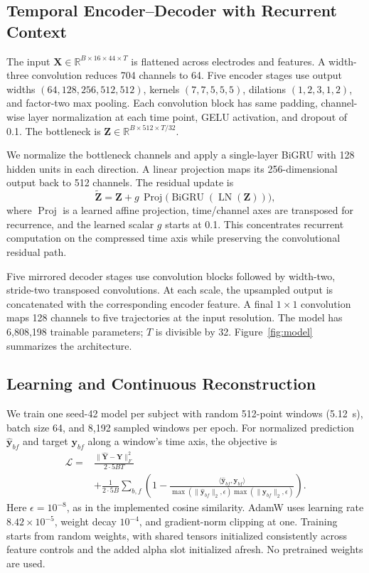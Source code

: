 \subsection{Temporal Encoder--Decoder with Recurrent Context}
The input $\mathbf X\in\mathbb R^{B\times16\times44\times T}$ is flattened across electrodes and features. A width-three convolution reduces 704 channels to 64. Five encoder stages use output widths $(64,128,256,512,512)$, kernels $(7,7,5,5,5)$, dilations $(1,2,3,1,2)$, and factor-two max pooling. Each convolution block has same padding, channel-wise layer normalization at each time point, GELU activation, and dropout of 0.1. The bottleneck is $\mathbf Z\in\mathbb R^{B\times512\times T/32}$.

We normalize the bottleneck channels and apply a single-layer BiGRU with 128 hidden units in each direction. A linear projection maps its 256-dimensional output back to 512 channels. The residual update is
\begin{equation}
\widetilde{\mathbf Z}=\mathbf Z+g\,\operatorname{Proj}
\bigl(\operatorname{BiGRU}(\operatorname{LN}(\mathbf Z))\bigr),
\end{equation}
where $\operatorname{Proj}$ is a learned affine projection, time/channel axes are transposed for recurrence, and the learned scalar $g$ starts at 0.1. This concentrates recurrent computation on the compressed time axis while preserving the convolutional residual path.

Five mirrored decoder stages use convolution blocks followed by width-two, stride-two transposed convolutions. At each scale, the upsampled output is concatenated with the corresponding encoder feature. A final $1\times1$ convolution maps 128 channels to five trajectories at the input resolution. The model has 6,808,198 trainable parameters; $T$ is divisible by 32. Figure~\ref{fig:model} summarizes the architecture.

\subsection{Learning and Continuous Reconstruction}
We train one seed-42 model per subject with random 512-point windows (5.12~s), batch size 64, and 8,192 sampled windows per epoch. For normalized prediction $\hat{\mathbf y}_{bf}$ and target $\mathbf y_{bf}$ along a window's time axis, the objective is
\begin{equation}
\begin{split}
\mathcal L={}&\frac{\|\hat{\mathbf Y}-\mathbf Y\|_F^2}{2\cdot5BT}\\
&+\frac{1}{2\cdot5B}\sum_{b,f}
\left(1-\frac{\langle\hat{\mathbf y}_{bf},\mathbf y_{bf}\rangle}
{\max(\|\hat{\mathbf y}_{bf}\|_2,\epsilon)\max(\|\mathbf y_{bf}\|_2,\epsilon)}\right).
\end{split}
\end{equation}
Here $\epsilon=10^{-8}$, as in the implemented cosine similarity. AdamW uses learning rate $8.42\times10^{-5}$, weight decay $10^{-4}$, and gradient-norm clipping at one. Training starts from random weights, with shared tensors initialized consistently across feature controls and the added alpha slot initialized afresh. No pretrained weights are used.

